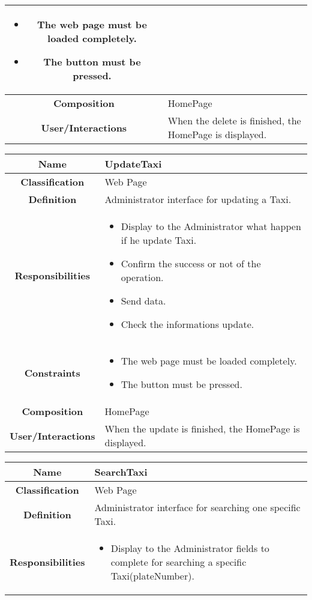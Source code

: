 \documentclass[11pt, a4paper,titlepage]{article}
\begin{document}
\begin{enumerate}
\begin{tabularx}{\textwidth}{| c | X |}
\begin{itemize}
		\item  The web page must be loaded completely.
		\item The button must be pressed.
	\end{itemize}
	\\
	\hline
	\textbf{Composition} & HomePage
	\\
	\hline
	\textbf{User/Interactions} &
	When the delete is finished, the HomePage is displayed.
	\\
	\hline 
\end{tabularx}
\begin{tabularx}{\textwidth}{| c | X |}
	\hline
	\textbf{Name} &
	UpdateTaxi
	\\
	\hline
	\textbf{Classification} &
	Web Page
	\\
	\hline
	\textbf{Definition} &
	Administrator interface for updating a Taxi.\\
	\hline
	\textbf{Responsibilities} &
	\begin{itemize}
		\item Display to the Administrator what happen if he update Taxi.
		\item Confirm the success or not of the operation.
		\item Send data.
		\item Check the informations update.
	\end{itemize}
	\\
	\hline
	\textbf{Constraints} &
	\begin{itemize}
		\item  The web page must be loaded completely.
		\item The button must be pressed.
	\end{itemize}
	\\
	\hline
	\textbf{Composition} & HomePage
	\\
	\hline
	\textbf{User/Interactions} &
	When the update is finished, the HomePage is displayed.
	\\
	\hline 
\end{tabularx}
\begin{tabularx}{\textwidth}{| c | X |}
	\hline
	\textbf{Name} &
	SearchTaxi
	\\
	\hline
	\textbf{Classification} &
	Web Page
	\\
	\hline
	\textbf{Definition} &
	Administrator interface for searching one specific Taxi.\\
	\hline
	\textbf{Responsibilities} &
	\begin{itemize}
		\item Display to the Administrator fields to complete for searching a specific Taxi(plateNumber).

\end{itemize}
\end{tabularx}
\end{enumerate}
\end{document}
